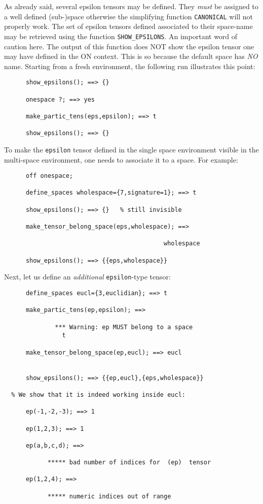 As already said, several epsilon tensors may be defined. They \emph{must}
be assigned to a well defined (sub-)space otherwise the simplifying
function \texttt{CANONICAL} will not properly work.
The set of epsilon tensors defined  associated to their space-name
may be retrieved using the function
\texttt{SHOW\_EPSILONS}.
An important word of caution here. The output of this function does NOT
show the epsilon tensor one may have defined in the ON  context.
This is so because the default space has \emph{NO} name.
Starting  from a fresh environment, the following run illustrates
this point:
\begin{verbatim}
      show_epsilons(); ==> {}

      onespace ?; ==> yes

      make_partic_tens(eps,epsilon); ==> t

      show_epsilons(); ==> {}
\end{verbatim}
To make the \texttt{epsilon} tensor defined in the single space environment
visible in the multi-space environment, one needs to associate it to
a space.
For example:
\begin{verbatim}
      off onespace;

      define_spaces wholespace={7,signature=1}; ==> t

      show_epsilons(); ==> {}   % still invisible

      make_tensor_belong_space(eps,wholespace); ==>

                                            wholespace

      show_epsilons(); ==> {{eps,wholespace}}
\end{verbatim}
Next, let us define an \emph{additional} \texttt{epsilon}-type tensor:
\begin{verbatim}
      define_spaces eucl={3,euclidian}; ==> t

      make_partic_tens(ep,epsilon); ==>

              *** Warning: ep MUST belong to a space
                t

      make_tensor_belong_space(ep,eucl); ==> eucl


      show_epsilons(); ==> {{ep,eucl},{eps,wholespace}}

  % We show that it is indeed working inside eucl:

      ep(-1,-2,-3); ==> 1

      ep(1,2,3); ==> 1

      ep(a,b,c,d); ==>

            ***** bad number of indices for  (ep)  tensor

      ep(1,2,4); ==>

            ***** numeric indices out of range
\end{verbatim}
